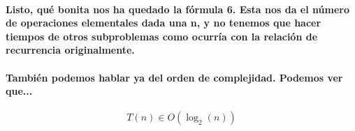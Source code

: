 \documentclass{book}
\begin{document}
	\paragraph{Listo, qué bonita nos ha quedado la fórmula 6. Esta nos da el número de operaciones elementales dada una n, y no tenemos que hacer tiempos de otros subproblemas como ocurría con la relación de recurrencia originalmente.}
	\paragraph{También podemos hablar ya del orden de complejidad. Podemos ver que...}
	\begin{equation}
		T(n) \in O(\log_{2}(n)) \nonumber
	\end{equation}		
\end{document}
